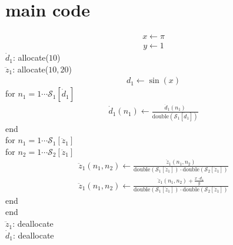 \documentclass[a4paper,fleqn]{ltjsarticle}
\begin{document}
\section{main code}
\begin{align}
x \leftarrow \pi
\end{align}
\begin{align}
y \leftarrow 1
\end{align}
$\dot{d}_{1}$: allocate($10$)\\
$\ddot{z}_{1}$: allocate($10,20$)\\
\begin{align}
d_{1} \leftarrow \sin(x)
\end{align}
for $n_{1}=1\cdots \mathcal{S}_1[\dot{d}_{1}]$\\
  \begin{align}
  \dot{d}_{1}(n_{1}) \leftarrow \frac{\displaystyle \dot{d}_{1}(n_{1})}{\displaystyle \mathrm{double}(\mathcal{S}_1[\dot{d}_{1}])}
  \end{align}
end\\
for $n_{1}=1\cdots \mathcal{S}_1[\ddot{z}_{1}]$\\
  for $n_{2}=1\cdots \mathcal{S}_2[\ddot{z}_{1}]$\\
    \begin{align}
    \ddot{z}_{1}(n_{1},n_{2}) \leftarrow \frac{\displaystyle \ddot{z}_{1}(n_{1},n_{2})}{\displaystyle \mathrm{double}(\mathcal{S}_1[\ddot{z}_{1}]) \cdot \mathrm{double}(\mathcal{S}_2[\ddot{z}_{1}])}
    \end{align}
    \begin{align}
    \ddot{z}_{1}(n_{1},n_{2}) \leftarrow \frac{\displaystyle \ddot{z}_{1}(n_{1},n_{2})+\frac{\displaystyle x \cdot d_{1}}{\displaystyle y}}{\displaystyle \mathrm{double}(\mathcal{S}_1[\ddot{z}_{1}]) \cdot \mathrm{double}(\mathcal{S}_2[\ddot{z}_{1}])}
    \end{align}
  end\\
end\\
$\ddot{z}_{1}$: deallocate\\
$\dot{d}_{1}$: deallocate\\
\end{document}
